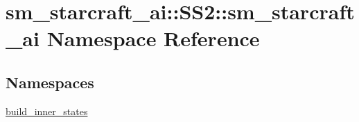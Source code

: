 \hypertarget{namespacesm__starcraft__ai_1_1SS2_1_1sm__starcraft__ai}{}\section{sm\+\_\+starcraft\+\_\+ai\+:\+:S\+S2\+:\+:sm\+\_\+starcraft\+\_\+ai Namespace Reference}
\label{namespacesm__starcraft__ai_1_1SS2_1_1sm__starcraft__ai}
\subsection*{Namespaces}
\begin{DoxyCompactItemize}
\item 
 \hyperlink{namespacesm__starcraft__ai_1_1SS2_1_1sm__starcraft__ai_1_1build__inner__states}{build\+\_\+inner\+\_\+states}
\end{DoxyCompactItemize}
